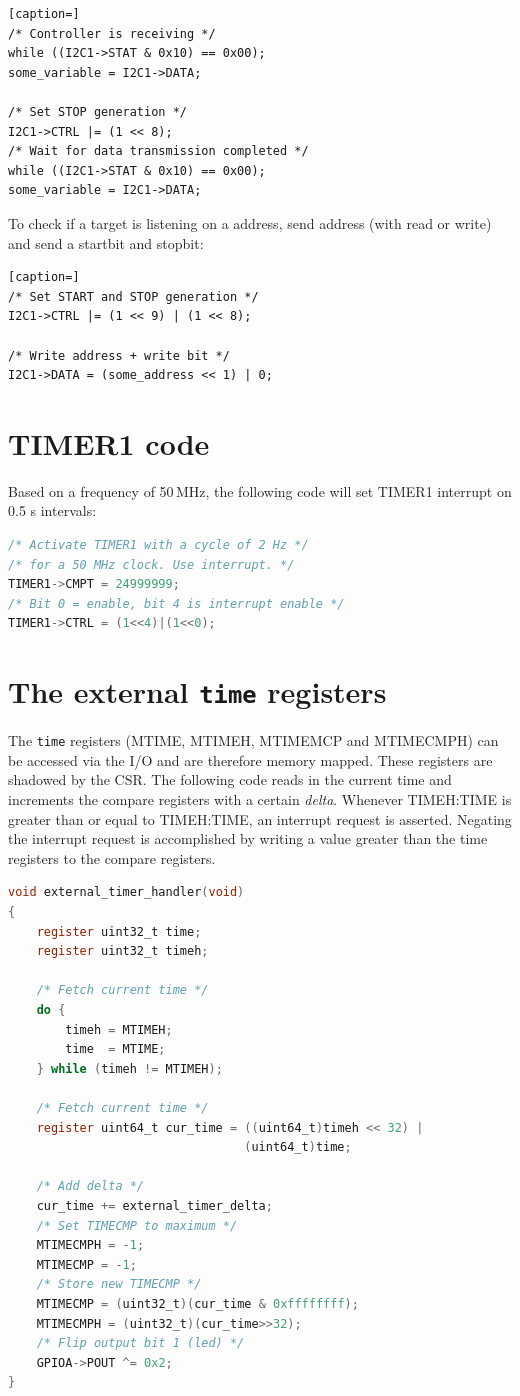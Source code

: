 \documentclass[12pt]{article}
\begin{document}
\begin{lstlisting}[caption=]
/* Controller is receiving */
while ((I2C1->STAT & 0x10) == 0x00);
some_variable = I2C1->DATA;

/* Set STOP generation */
I2C1->CTRL |= (1 << 8);
/* Wait for data transmission completed */
while ((I2C1->STAT & 0x10) == 0x00);
some_variable = I2C1->DATA;
\end{lstlisting} 

To check if a target is listening on a address, send address (with read or write) and send a startbit and stopbit:

\begin{lstlisting}[caption=]
/* Set START and STOP generation */
I2C1->CTRL |= (1 << 9) | (1 << 8);

/* Write address + write bit */
I2C1->DATA = (some_address << 1) | 0;
\end{lstlisting} 


\section{TIMER1 code}
Based on a frequency of 50$\,$MHz, the following code will set TIMER1 interrupt on 0.5 s intervals:

\begin{lstlisting}[language=C]
/* Activate TIMER1 with a cycle of 2 Hz */
/* for a 50 MHz clock. Use interrupt. */
TIMER1->CMPT = 24999999;
/* Bit 0 = enable, bit 4 is interrupt enable */
TIMER1->CTRL = (1<<4)|(1<<0);
\end{lstlisting}

\section{The external \texttt{time} registers}
The \lstinline|time| registers (MTIME, MTIMEH, MTIMEMCP and MTIMECMPH) can be accessed via the I/O and are therefore memory mapped. These registers are shadowed by the CSR. The following code reads in the current time and increments the compare registers with a certain \emph{delta}. Whenever TIMEH:TIME is greater than or equal to TIMEH:TIME, an interrupt request is asserted. Negating the interrupt request is accomplished by writing a value greater than the time registers to the compare registers.

\begin{lstlisting}[language=C]
void external_timer_handler(void)
{
    register uint32_t time;
    register uint32_t timeh;

    /* Fetch current time */
    do {
        timeh = MTIMEH;
        time  = MTIME;
    } while (timeh != MTIMEH);

    /* Fetch current time */
    register uint64_t cur_time = ((uint64_t)timeh << 32) |
                                 (uint64_t)time;

    /* Add delta */
    cur_time += external_timer_delta;
    /* Set TIMECMP to maximum */
    MTIMECMPH = -1;
    MTIMECMP = -1;
    /* Store new TIMECMP */
    MTIMECMP = (uint32_t)(cur_time & 0xffffffff);
    MTIMECMPH = (uint32_t)(cur_time>>32);
    /* Flip output bit 1 (led) */
    GPIOA->POUT ^= 0x2;
}
\end{lstlisting}
\end{document}
